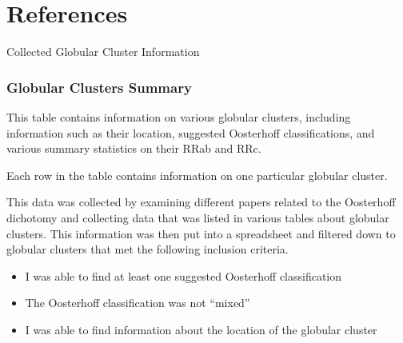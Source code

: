 \documentclass[]{article}
\begin{document}
\newpage

\singlespacing

\section{References}

\begingroup
\renewcommand{\section}[2]{}


\endgroup

\newpage

\section{Appendices}

\subsection{Collected Globular Cluster Information}

\subsubsection{Globular Clusters Summary}
\label{sec:app_globular_clusters_summary}

This table contains information on various globular clusters, including information such as their location, suggested Oosterhoff classifications, and various summary statistics on their RRab and RRc.

\vspace{12pt}

Each row in the table contains information on one particular globular cluster.

\vspace{12pt}

This data was collected by examining different papers related to the Oosterhoff dichotomy and collecting data that was listed in various tables about globular clusters. This information was then put into a spreadsheet and filtered down to globular clusters that met the following inclusion criteria.

\begin{itemize}
	\item I was able to find at least one suggested Oosterhoff classification
	\item The Oosterhoff classification was not ``mixed''
	\item I was able to find information about the location of the globular cluster
\end{itemize}
\end{document}
